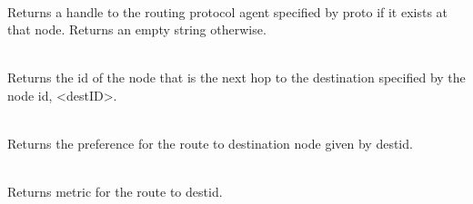 \begin{flushleft}
\\
Returns a handle to the routing protocol agent specified by proto if it
exists at that node. Returns an empty string otherwise. 


\\
Returns the id of the node that is the next hop to the destination
specified by the node id, <destID>. 


\\
Returns the preference for the route to destination node given by destid.


\\
Returns metric for the route to destid.

\end{flushleft}

\endinput

### Local Variables:
### mode: latex
### comment-column: 60
### backup-by-copying-when-linked: t
### file-precious-flag: nil
### End:
